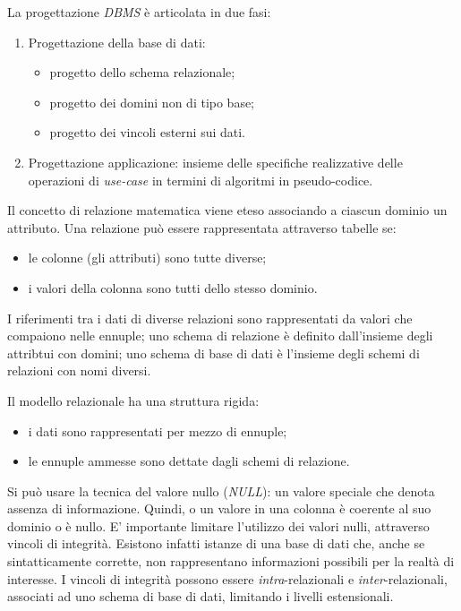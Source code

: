 La progettazione \textit{DBMS} è articolata in due fasi:
\begin{enumerate}
	\item Progettazione della base di dati:
	\begin{itemize}
		\item progetto dello schema relazionale;
		\item progetto dei domini non di tipo base;
		\item progetto dei vincoli esterni sui dati.
	\end{itemize}
	\item Progettazione applicazione: insieme delle specifiche realizzative delle operazioni di \textit{use-case} in termini di algoritmi in pseudo-codice. \\
\end{enumerate}

Il concetto di relazione matematica viene eteso associando a ciascun dominio un attributo.
Una relazione può essere rappresentata attraverso tabelle se:
\begin{itemize}
	\item le colonne (gli attributi) sono tutte diverse;
	\item i valori della colonna sono tutti dello stesso dominio.
\end{itemize}

I riferimenti tra i dati di diverse relazioni sono rappresentati da valori che compaiono nelle ennuple; uno schema di relazione è definito dall'insieme degli attribtui con domini; uno schema di base di dati è l'insieme degli schemi di relazioni con nomi diversi.

Il modello relazionale ha una struttura rigida:
\begin{itemize}
	\item i dati sono rappresentati per mezzo di ennuple;
	\item le ennuple ammesse sono dettate dagli schemi di relazione.
\end{itemize}

Si può usare la tecnica del valore nullo (\textit{NULL}): un valore speciale che denota assenza di informazione. Quindi, o un valore in una colonna è coerente al suo dominio o è nullo. E' importante limitare l'utilizzo dei valori nulli, attraverso vincoli di integrità. Esistono infatti istanze di una base di dati che, anche se sintatticamente corrette, non rappresentano informazioni possibili per la realtà di interesse. I vincoli di integrità possono essere \textit{intra}-relazionali e \textit{inter}-relazionali, associati ad uno schema di base di dati, limitando i livelli estensionali.

